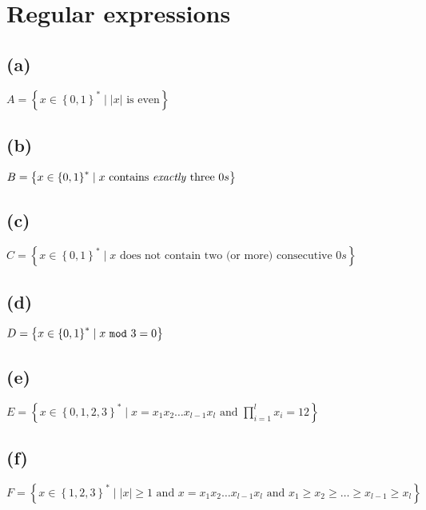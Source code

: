 



\section{Regular expressions}

\subsection{(a)}

$A = \left\{ x \in \left\{0,1\right\} ^{*} \mid \lvert x \rvert \text{ is even} \right\}$

\subsection{(b)}

$B = \left\{ x \in \left\{0,1\right\} ^{*} \mid x \text{ contains \textit{exactly} three } 0s \right\}$

\subsection{(c)}

$C = \left\{ x \in \left\{0,1\right\} ^{*} \mid x \text{ does not contain two (or more) consecutive } 0s \right\}$

\subsection{(d)}

$D = \left\{ x \in \left\{0,1\right\} ^{*} \mid x \text{ \texttt{mod} } 3 = 0 \right\}$

\subsection{(e)}

$E = \left\{ x \in \left\{0,1,2,3\right\} ^{*} \mid x = x_1x_2\ldots x_{l-1}x_l \text{ and } \prod_{i=1}^{l} x_i = 12\right\}$

\subsection{(f)}

$F = \left\{ x \in \left\{1,2,3\right\} ^{*} \mid \lvert x \rvert \geq 1 \text{ and } x = x_1x_2\ldots x_{l-1}x_l \text{ and } x_1 \geq x_2 \geq \ldots \geq x_{l-1} \geq x_l \right\}$


